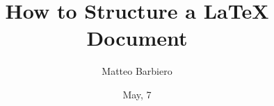 

\title{How to Structure a LaTeX Document}
\author{Matteo Barbiero}
\date{May, 7 }

	

	\maketitle
	\tableofcontents
	
	\newpage		
	\printbibliography



